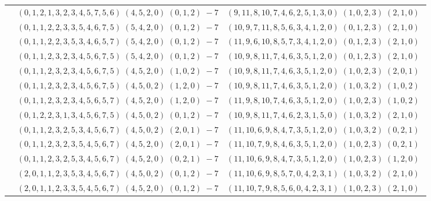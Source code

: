 \documentclass[11pt]{article}
\begin{document}
\begin{longtable}[l]{|c|c|c|}
 \cline{2-3} 
 & $(0 ,1 ,2 ,1 ,3 ,2 ,3 ,4 ,5 ,7 ,5 ,6) \;(4 ,5 ,2 ,0) \;(0 ,1 ,2) \;-7$ & $(9 ,11 ,8 ,10 ,7 ,4 ,6 ,2 ,5 ,1 ,3 ,0) \;(1 ,0 ,2 ,3) \;(2 ,1 ,0) \;$\\ 
 \cline{2-3} 
 & $(0 ,1 ,1 ,2 ,2 ,3 ,3 ,5 ,4 ,6 ,7 ,5) \;(5 ,4 ,2 ,0) \;(0 ,1 ,2) \;-7$ & $(10 ,9 ,7 ,11 ,8 ,5 ,6 ,3 ,4 ,1 ,2 ,0) \;(0 ,1 ,2 ,3) \;(2 ,1 ,0) \;$\\ 
 \cline{2-3} 
 & $(0 ,1 ,1 ,2 ,2 ,3 ,5 ,3 ,4 ,6 ,5 ,7) \;(5 ,4 ,2 ,0) \;(0 ,1 ,2) \;-7$ & $(11 ,9 ,6 ,10 ,8 ,5 ,7 ,3 ,4 ,1 ,2 ,0) \;(0 ,1 ,2 ,3) \;(2 ,1 ,0) \;$\\ 
 \cline{2-3} 
 & $(0 ,1 ,1 ,2 ,3 ,2 ,3 ,4 ,5 ,6 ,7 ,5) \;(5 ,4 ,2 ,0) \;(0 ,1 ,2) \;-7$ & $(10 ,9 ,8 ,11 ,7 ,4 ,6 ,3 ,5 ,1 ,2 ,0) \;(0 ,1 ,2 ,3) \;(2 ,1 ,0) \;$\\ 
 \cline{2-3} 
 & $(0 ,1 ,1 ,2 ,3 ,2 ,3 ,4 ,5 ,6 ,7 ,5) \;(4 ,5 ,2 ,0) \;(1 ,0 ,2) \;-7$ & $(10 ,9 ,8 ,11 ,7 ,4 ,6 ,3 ,5 ,1 ,2 ,0) \;(1 ,0 ,2 ,3) \;(2 ,0 ,1) \;$\\ 
 \cline{2-3} 
 & $(0 ,1 ,1 ,2 ,3 ,2 ,3 ,4 ,5 ,6 ,7 ,5) \;(4 ,5 ,0 ,2) \;(1 ,2 ,0) \;-7$ & $(10 ,9 ,8 ,11 ,7 ,4 ,6 ,3 ,5 ,1 ,2 ,0) \;(1 ,0 ,3 ,2) \;(1 ,0 ,2) \;$\\ 
 \cline{2-3} 
 & $(0 ,1 ,1 ,2 ,3 ,2 ,3 ,4 ,5 ,6 ,5 ,7) \;(4 ,5 ,2 ,0) \;(1 ,2 ,0) \;-7$ & $(11 ,9 ,8 ,10 ,7 ,4 ,6 ,3 ,5 ,1 ,2 ,0) \;(1 ,0 ,2 ,3) \;(1 ,0 ,2) \;$\\ 
 \cline{2-3} 
 & $(0 ,1 ,2 ,2 ,3 ,1 ,3 ,4 ,5 ,6 ,7 ,5) \;(4 ,5 ,0 ,2) \;(0 ,1 ,2) \;-7$ & $(10 ,9 ,8 ,11 ,7 ,4 ,6 ,2 ,3 ,1 ,5 ,0) \;(1 ,0 ,3 ,2) \;(2 ,1 ,0) \;$\\ 
 \cline{2-3} 
 & $(0 ,1 ,1 ,2 ,3 ,2 ,5 ,3 ,4 ,5 ,6 ,7) \;(4 ,5 ,0 ,2) \;(2 ,0 ,1) \;-7$ & $(11 ,10 ,6 ,9 ,8 ,4 ,7 ,3 ,5 ,1 ,2 ,0) \;(1 ,0 ,3 ,2) \;(0 ,2 ,1) \;$\\ 
 \cline{2-3} 
 & $(0 ,1 ,1 ,2 ,3 ,2 ,3 ,5 ,4 ,5 ,6 ,7) \;(4 ,5 ,2 ,0) \;(2 ,0 ,1) \;-7$ & $(11 ,10 ,7 ,9 ,8 ,4 ,6 ,3 ,5 ,1 ,2 ,0) \;(1 ,0 ,2 ,3) \;(0 ,2 ,1) \;$\\ 
 \cline{2-3} 
 & $(0 ,1 ,1 ,2 ,3 ,2 ,5 ,3 ,4 ,5 ,6 ,7) \;(4 ,5 ,2 ,0) \;(0 ,2 ,1) \;-7$ & $(11 ,10 ,6 ,9 ,8 ,4 ,7 ,3 ,5 ,1 ,2 ,0) \;(1 ,0 ,2 ,3) \;(1 ,2 ,0) \;$\\ 
 \cline{2-3} 
 & $(2 ,0 ,1 ,1 ,2 ,3 ,5 ,3 ,4 ,5 ,6 ,7) \;(4 ,5 ,0 ,2) \;(0 ,1 ,2) \;-7$ & $(11 ,10 ,6 ,9 ,8 ,5 ,7 ,0 ,4 ,2 ,3 ,1) \;(1 ,0 ,3 ,2) \;(2 ,1 ,0) \;$\\ 
 \cline{2-3} 
 & $(2 ,0 ,1 ,1 ,2 ,3 ,3 ,5 ,4 ,5 ,6 ,7) \;(4 ,5 ,2 ,0) \;(0 ,1 ,2) \;-7$ & $(11 ,10 ,7 ,9 ,8 ,5 ,6 ,0 ,4 ,2 ,3 ,1) \;(1 ,0 ,2 ,3) \;(2 ,1 ,0) \;$\\ 

\end{longtable}
\end{document}
